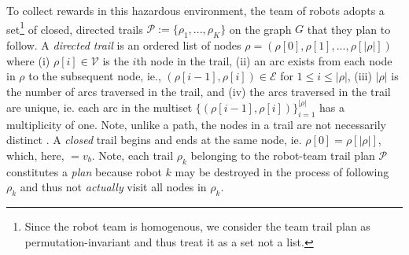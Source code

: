\documentclass[11pt, oneside]{article}
\begin{document}
To collect rewards in this hazardous environment, the team of robots adopts a set\footnote{Since the robot team is homogenous, we consider the team trail plan as permutation-invariant and thus treat it as a set not a list.} of closed, directed trails $\mathcal{P}:=\{\rho_1, ..., \rho_K\}$ on the graph $G$ that they plan to follow.
A \emph{directed trail} \cite{clark1991first,graphtheory2} is an ordered list of nodes $\rho = (\rho[0], \rho[1], ..., \rho[\lvert \rho \rvert])$ where
(i) $\rho[i] \in \mathcal{V}$ is the $i$th node in the trail,  
(ii) an arc exists from each node in $\rho$ to the subsequent node, ie., $(\rho[i-1], \rho[i])\in\mathcal{E}$ for $1 \leq i  \leq \lvert \rho \rvert$,
(iii) $\lvert \rho \rvert$ is the number of arcs traversed in the trail,
and
(iv) the arcs traversed in the trail are unique, ie. each arc in the multiset $\{(\rho[i-1], \rho[i])\}_{i=1}^{\lvert \rho \rvert}$ has a multiplicity of one.
Note, unlike a path, the nodes in a trail are not necessarily distinct \cite{wilson1979introduction}.
A \emph{closed} trail begins and ends at the same node, ie. $\rho [0]=\rho[\lvert \rho \rvert]$, which, here, $=v_b$.
Note, each trail $\rho_k$ belonging to the robot-team trail plan $\mathcal{P}$ constitutes a \emph{plan} because robot $k$ may be destroyed in the process of following $\rho_k$ and thus not \emph{actually} visit all nodes in $\rho_k$.
\end{document}
